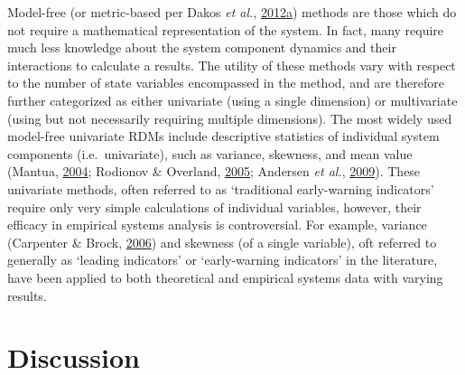 \documentclass[12pt,twoside,openany]{reedthesis}
\begin{document}
Model-free (or metric-based per Dakos \emph{et al.}, \protect\hyperlink{ref-dakos2012methods}{2012}\protect\hyperlink{ref-dakos2012methods}{a}) methods are those which do not require a mathematical representation of the system. In fact, many require much less knowledge about the system component dynamics and their interactions to calculate a results. The utility of these methods vary with respect to the number of state variables encompassed in the method, and are therefore further categorized as either univariate (using a single dimension) or multivariate (using but not necessarily requiring multiple dimensions). The most widely used model-free univariate RDMs include descriptive statistics of individual system components (i.e.~univariate), such as variance, skewness, and mean value (Mantua, \protect\hyperlink{ref-mantua_methods_2004}{2004}; Rodionov \& Overland, \protect\hyperlink{ref-rodionov_application_2005}{2005}; Andersen \emph{et al.}, \protect\hyperlink{ref-andersen_ecological_2009}{2009}). These univariate methods, often referred to as `traditional early-warning indicators' require only very simple calculations of individual variables, however, their efficacy in empirical systems analysis is controversial. For example, variance (Carpenter \& Brock, \protect\hyperlink{ref-carpenter2006rising}{2006}) and skewness (of a single variable), oft referred to generally as `leading indicators' or `early-warning indicators' in the literature, have been applied to both theoretical and empirical systems data with varying results.

\hypertarget{discussion}{%
\section{Discussion}\label{discussion}}
\end{document}
